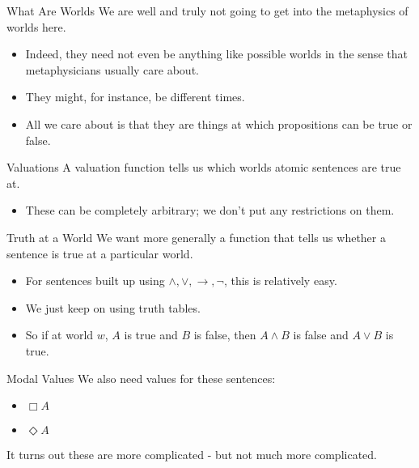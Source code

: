 \documentclass[
  14pt,
  letterpaper,
  ignorenonframetext,
  aspectratio=169,
]{beamer}
\providecommand{\tightlist}{%
  \setlength{\itemsep}{0pt}\setlength{\parskip}{0pt}}\usepackage{longtable,booktabs,array}
\begin{document}
\begin{frame}{What Are Worlds}
\protect\hypertarget{what-are-worlds}{}
We are well and truly not going to get into the metaphysics of worlds
here.

\begin{itemize}[<+->]
\tightlist
\item
  Indeed, they need not even be anything like possible worlds in the
  sense that metaphysicians usually care about.
\item
  They might, for instance, be different times.
\item
  All we care about is that they are things at which propositions can be
  true or false.
\end{itemize}
\end{frame}

\begin{frame}{Valuations}
\protect\hypertarget{valuations}{}
A valuation function tells us which worlds atomic sentences are true at.

\begin{itemize}[<+->]
\tightlist
\item
  These can be completely arbitrary; we don't put any restrictions on
  them.
\end{itemize}
\end{frame}

\begin{frame}{Truth at a World}
\protect\hypertarget{truth-at-a-world}{}
We want more generally a function that tells us whether a sentence is
true at a particular world.

\begin{itemize}[<+->]
\tightlist
\item
  For sentences built up using \(\wedge, \vee, \rightarrow, \neg\), this
  is relatively easy.
\item
  We just keep on using truth tables.
\item
  So if at world \(w\), \(A\) is true and \(B\) is false, then
  \(A \wedge B\) is false and \(A \vee B\) is true.
\end{itemize}
\end{frame}

\begin{frame}{Modal Values}
\protect\hypertarget{modal-values}{}
We also need values for these sentences:

\begin{itemize}[<+->]
\tightlist
\item
  \(\Box A\)
\item
  \(\Diamond A\)
\end{itemize}

It turns out these are more complicated - but not much more complicated.
\end{frame}
\end{document}
